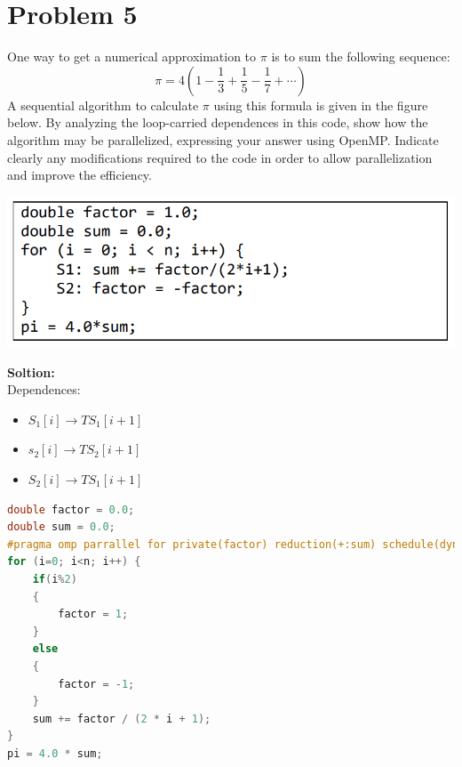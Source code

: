 \documentclass{article}
\begin{document}
\section{Problem 5}
One way to get a numerical approximation to $\pi$ is to sum the following 
sequence: 
$$\pi=4(1-\frac{1}{3}+\frac{1}{5}-\frac{1}{7}+\cdots)$$
A sequential algorithm to calculate $\pi$ using this formula is given in the figure 
below. By analyzing the loop-carried dependences in this code, show how the 
algorithm may be parallelized, expressing your answer using OpenMP. Indicate 
clearly any modifications required to the code in order to allow parallelization 
and improve the efficiency. 
\begin{center}
    \includegraphics[scale = 0.4]{5.png}\\
\end{center}
\textbf{Soltion:}\\
Dependences:
\begin{itemize}
    \item $S_{1}[i]\rightarrow TS_{1}[i+1]$
    \item $s_{2}[i]\rightarrow TS_{2}[i+1]$
    \item $S_{2}[i]\rightarrow TS_{1}[i+1]$
\end{itemize}
\begin{lstlisting}[language=c++]
double factor = 0.0;
double sum = 0.0;
#pragma omp parrallel for private(factor) reduction(+:sum) schedule(dynamic)
for (i=0; i<n; i++) {
    if(i%2)
    {
        factor = 1;
    }
    else
    {
        factor = -1;
    }
    sum += factor / (2 * i + 1);
}
pi = 4.0 * sum;
\end{lstlisting}
\end{document}

